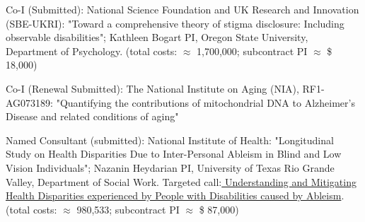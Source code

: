 \item Co-I (Submitted): National Science Foundation and UK Research and Innovation (SBE-UKRI): "Toward a comprehensive theory of stigma disclosure: Including observable disabilities"; Kathleen Bogart PI, Oregon State University, Department of Psychology.  (total costs: $\approx$ 1,700,000; subcontract PI $\approx$ \$ 18,000)
\item Co-I (Renewal Submitted): The National Institute on Aging (NIA), RF1-AG073189: "Quantifying the contributions of mitochondrial DNA to Alzheimer's Disease and related conditions of aging"
\item Named Consultant (submitted): National Institute of Health: %
"Longitudinal Study on Health Disparities Due to Inter-Personal Ableism in Blind and Low Vision Individuals"; Nazanin Heydarian PI, University of Texas Rio Grande Valley, Department of Social Work. Targeted call:\href{https://grants.nih.gov/grants/guide/rfa-files/RFA-HD-24-007.html}{\color{blue} Understanding and Mitigating Health Disparities experienced by People with Disabilities caused by Ableism}. (total costs: $\approx$ 980,533; subcontract PI $\approx$ \$ 87,000)



%
%
